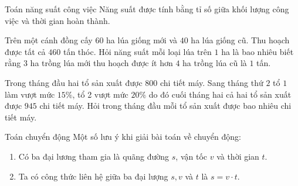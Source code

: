 \begin{dang}{Toán năng suất công việc}
Năng suất được tính bằng tỉ số giữa khối lượng công việc và thời gian hoàn thành.
\end{dang}

\begin{vd}
Trên một cánh đồng cấy $ 60 $ ha lúa giống mới và $ 40 $ ha lúa giống cũ. Thu hoạch được tất cả $ 460 $ tấn thóc. Hỏi năng suất mỗi loại lúa trên $ 1 $ ha là bao nhiêu biết rằng $ 3 $ ha trồng lúa mới thu hoạch được ít hơn $ 4 $ ha trồng lúa cũ là $ 1 $ tấn.
\end{vd}

\begin{vd}
Trong tháng đầu hai tổ sản xuất được $ 800 $ chi tiết máy. Sang tháng thứ $ 2 $ tổ $ 1 $ làm vượt mức $ 15\% $, tổ 2 vượt mức $ 20\% $ do đó cuối tháng hai cả hai tổ sản xuất được $ 945 $ chi tiết máy. Hỏi trong tháng đầu mỗi tổ sản xuất được bao nhiêu chi tiết máy.
\end{vd}




\begin{dang}{Toán chuyển động}
Một số lưu ý khi giải bài toán về chuyển động:
\begin{enumerate}[1.]
	\item Có ba đại lương tham gia là quãng đường  $s$, vận tốc  $v$  và thời gian  $t.$
	\item Ta có công thức liên hệ giữa ba đại lượng  $s,v$  và  $t$  là $s = v \cdot t$. 
\end{enumerate}
\end{dang}

